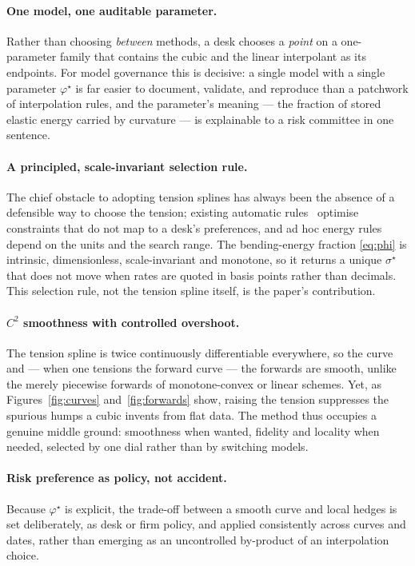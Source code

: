 \documentclass[10pt]{article}
\begin{document}
\paragraph{One model, one auditable parameter.} Rather than choosing \emph{between} methods, a
desk chooses a \emph{point} on a one-parameter family that contains the cubic and the linear
interpolant as its endpoints. For model governance this is decisive: a single model with a
single parameter $\varphi^\star$ is far easier to document, validate, and reproduce than a
patchwork of interpolation rules, and the parameter's meaning --- the fraction of stored
elastic energy carried by curvature --- is explainable to a risk committee in one sentence.

\paragraph{A principled, scale-invariant selection rule.} The chief obstacle to adopting
tension splines has always been the absence of a defensible way to choose the tension; existing
automatic rules~\cite{Renka} optimise constraints that do not map to a desk's preferences, and
ad hoc energy rules depend on the units and the search range. The bending-energy fraction
\eqref{eq:phi} is intrinsic, dimensionless, scale-invariant and monotone, so it returns a unique
$\sigma^\star$ that does not move when rates are quoted in basis points rather than decimals.
This selection rule, not the tension spline itself, is the paper's contribution.

\paragraph{$C^2$ smoothness with controlled overshoot.} The tension spline is twice
continuously differentiable everywhere, so the curve and --- when one tensions the forward
curve --- the forwards are smooth, unlike the merely piecewise forwards of monotone-convex or
linear schemes. Yet, as Figures~\ref{fig:curves} and~\ref{fig:forwards} show, raising the
tension suppresses the spurious humps a cubic invents from flat data. The method thus occupies
a genuine middle ground: smoothness when wanted, fidelity and locality when needed, selected by
one dial rather than by switching models.

\paragraph{Risk preference as policy, not accident.} Because $\varphi^\star$ is explicit, the
trade-off between a smooth curve and local hedges is set deliberately, as desk or firm policy,
and applied consistently across curves and dates, rather than emerging as an uncontrolled
by-product of an interpolation choice.
\end{document}
